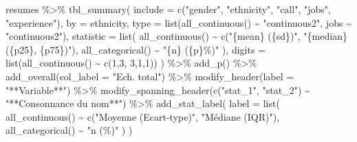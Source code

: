 \documentclass[
  11pt,
]{book}
\newenvironment{Shaded}{\begin{snugshade}}{\end{snugshade}}
\newcommand{\AttributeTok}[1]{\textcolor[rgb]{0.77,0.63,0.00}{#1}}
\newcommand{\DecValTok}[1]{\textcolor[rgb]{0.00,0.00,0.81}{#1}}
\newcommand{\FunctionTok}[1]{\textcolor[rgb]{0.00,0.00,0.00}{#1}}
\newcommand{\NormalTok}[1]{#1}
\newcommand{\SpecialCharTok}[1]{\textcolor[rgb]{0.00,0.00,0.00}{#1}}
\newcommand{\StringTok}[1]{\textcolor[rgb]{0.31,0.60,0.02}{#1}}
\numberwithin{equation}{section}
\numberwithin{countremarque}{section}
\begin{document}
\begin{Shaded}
\begin{Highlighting}[]
\NormalTok{resumes }\SpecialCharTok{\%\textgreater{}\%}
  \FunctionTok{tbl\_summary}\NormalTok{(}
    \AttributeTok{include =} \FunctionTok{c}\NormalTok{(}\StringTok{"gender"}\NormalTok{, }\StringTok{"ethnicity"}\NormalTok{, }\StringTok{"call"}\NormalTok{, }\StringTok{"jobs"}\NormalTok{, }\StringTok{"experience"}\NormalTok{),}
    \AttributeTok{by =}\NormalTok{ ethnicity,}
    \AttributeTok{type =} \FunctionTok{list}\NormalTok{(}\FunctionTok{all\_continuous}\NormalTok{() }\SpecialCharTok{\textasciitilde{}} \StringTok{"continuous2"}\NormalTok{,}
\NormalTok{                jobs }\SpecialCharTok{\textasciitilde{}} \StringTok{"continuous2"}\NormalTok{),}
    \AttributeTok{statistic =} \FunctionTok{list}\NormalTok{(}
      \FunctionTok{all\_continuous}\NormalTok{() }\SpecialCharTok{\textasciitilde{}} \FunctionTok{c}\NormalTok{(}\StringTok{"\{mean\} (\{sd\})"}\NormalTok{, }\StringTok{"\{median\} (\{p25\}, \{p75\})"}\NormalTok{),}
      \FunctionTok{all\_categorical}\NormalTok{() }\SpecialCharTok{\textasciitilde{}} \StringTok{"\{n\} (\{p\}\%)"}
\NormalTok{      ),}
    \AttributeTok{digits =} \FunctionTok{list}\NormalTok{(}\FunctionTok{all\_continuous}\NormalTok{() }\SpecialCharTok{\textasciitilde{}} \FunctionTok{c}\NormalTok{(}\DecValTok{1}\NormalTok{,}\DecValTok{3}\NormalTok{, }\DecValTok{3}\NormalTok{,}\DecValTok{1}\NormalTok{,}\DecValTok{1}\NormalTok{))}
\NormalTok{    ) }\SpecialCharTok{\%\textgreater{}\%} 
  \FunctionTok{add\_p}\NormalTok{() }\SpecialCharTok{\%\textgreater{}\%} 
  \FunctionTok{add\_overall}\NormalTok{(}\AttributeTok{col\_label =} \StringTok{"Ech. total"}\NormalTok{) }\SpecialCharTok{\%\textgreater{}\%} 
  \FunctionTok{modify\_header}\NormalTok{(}\AttributeTok{label =} \StringTok{"**Variable**"}\NormalTok{) }\SpecialCharTok{\%\textgreater{}\%} 
  \FunctionTok{modify\_spanning\_header}\NormalTok{(}\FunctionTok{c}\NormalTok{(}\StringTok{"stat\_1"}\NormalTok{, }\StringTok{"stat\_2"}\NormalTok{) }\SpecialCharTok{\textasciitilde{}} \StringTok{"**Consonnance du nom**"}\NormalTok{) }\SpecialCharTok{\%\textgreater{}\%} 
  \FunctionTok{add\_stat\_label}\NormalTok{(}
    \AttributeTok{label =} \FunctionTok{list}\NormalTok{(}
      \FunctionTok{all\_continuous}\NormalTok{() }\SpecialCharTok{\textasciitilde{}} \FunctionTok{c}\NormalTok{(}\StringTok{"Moyenne (Ecart{-}type)"}\NormalTok{, }\StringTok{"Médiane (IQR)"}\NormalTok{),}
      \FunctionTok{all\_categorical}\NormalTok{() }\SpecialCharTok{\textasciitilde{}} \StringTok{"n (\%)"}
\NormalTok{    )}
\NormalTok{  )}
\end{Highlighting}
\end{Shaded}
\end{document}
